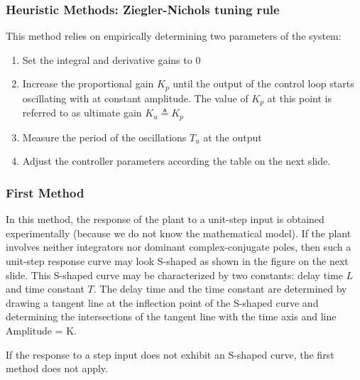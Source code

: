 \begin{frame}
	\frametitle{Heuristic Methods: Ziegler-Nichols tuning rule}
		This method relies on empirically determining two parameters of the system:
		\begin{enumerate}
			\item Set the integral and derivative gains to 0
			\item Increase the proportional gain $K_p$ until the output of the control loop starts oscillating with at constant amplitude. The value of $K_p$ at this point is referred to as ultimate gain $K_u \triangleq K_p$
			\item Measure the period of the oscillations $T_u$ at the output
			\item Adjust the controller parameters according the table on the next slide.
		\end{enumerate}
\end{frame}

\begin{frame}
	\frametitle{First Method}
	\justify
	In this method, the response of the plant to a unit-step input is obtained experimentally (because we do not know the mathematical model). If the plant involves neither integrators nor dominant complex-conjugate poles, then such a unit-step response curve may look S-shaped as shown in the figure on the next slide. This S-shaped curve may be characterized by two constants: delay time $L$ and time constant $T$. The delay time and the time constant are determined by drawing a tangent line at the inflection point of the S-shaped curve and determining the intersections of the tangent line with the time axis and line Amplitude = K.
	\begin{alertblock}{}
		If the response to a step input does not exhibit an S-shaped curve, the first method does not apply.
	\end{alertblock}
\end{frame}

